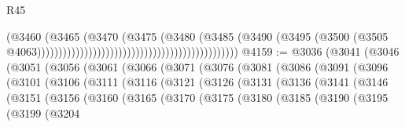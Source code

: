 \begin{lexlean}{R45}
\begin{coremodule}
{                                                                              (@3460
                                                                                (@3465
                                                                                  (@3470
                                                                                    (@3475
                                                                                      (@3480
                                                                                        (@3485
                                                                                          (@3490
                                                                                            (@3495
                                                                                              (@3500
                                                                                                (@3505
                                                                                                  @4063)))))))))))))))))))))))))))))))))))))))))))))))
@4159 := @3036
    (@3041
      (@3046
        (@3051
          (@3056
            (@3061
              (@3066
                (@3071
                  (@3076
                    (@3081
                      (@3086
                        (@3091
                          (@3096
                            (@3101
                              (@3106
                                (@3111
                                  (@3116
                                    (@3121
                                      (@3126
                                        (@3131
                                          (@3136
                                            (@3141
                                              (@3146
                                                (@3151
                                                  (@3156
                                                    (@3160
                                                      (@3165
                                                        (@3170
                                                          (@3175
                                                            (@3180
                                                              (@3185
                                                                (@3190
                                                                  (@3195
                                                                    (@3199
                                                                      (@3204
}
\end{coremodule}
\end{lexlean}
